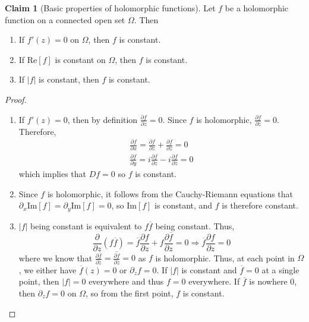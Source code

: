\documentclass[aps,pra,showpacs,notitlepage,onecolumn,superscriptaddress,nofootinbib]{revtex4-1}
\theoremstyle{definition}
\newtheorem{claim}{Claim}[section]
\begin{document}
\begin{claim}[Basic properties of holomorphic functions]
  Let $f$ be a holomorphic function on a connected open set $\Omega$. Then
  \begin{enumerate}
  \item If $f'(z) = 0$ on $\Omega$, then $f$ is constant.
  \item If $\text{Re}[f]$ is constant on $\Omega$, then $f$ is constant.
    \item If $|f|$ is constant, then $f$ is constant.
    \end{enumerate}
\end{claim}
\begin{proof}
  \begin{enumerate}
  \item If $f'(z) = 0$, then by definition $\frac{\partial f}{\partial z} = 0$. Since $f$ is holomorphic, $\frac{\partial f}{\partial \overline{z}} = 0$. Therefore,
    \begin{align}
      \frac{\partial f}{\partial x} = \frac{\partial f}{\partial z} + \frac{\partial f}{\partial \overline{z}} = 0
      \\  \frac{\partial f}{\partial y} = i\frac{\partial f}{\partial z} - i \frac{\partial f}{\partial \overline{z}} = 0
    \end{align}
    which implies that $Df = 0$ so $f$ is constant.
  \item Since $f$ is holomorphic, it follows from the Cauchy-Riemann equations that $\partial_x \text{Im}[f] = \partial_y \text{Im}[f] = 0$, so $\text{Im}[f]$ is constant, and $f$ is therefore constant.
  \item $|f|$ being constant is equivalent to $f \overline{f}$ being constant. Thus,
    \begin{equation}
      \frac{\partial}{\partial z} (f \overline{f}) = \overline{f} \frac{\partial f}{\partial z} + f \frac{\partial \overline{f}}{\partial z} = 0 \Longrightarrow \overline{f} \frac{\partial f}{\partial z} = 0
    \end{equation}
    where we know that $\frac{\partial \overline{f}}{\partial z} = \overline{\frac{\partial f}{\partial \overline{z}}} = 0$ as $f$ is holomorphic. Thus, at each point in $\Omega$, we either have $\overline{f}(z) = 0$ or
    $\partial_z f = 0$. If $|f|$ is constant and $\overline{f} = 0$ at a single point, then $|f| = 0$ everywhere and thus $f = 0$ everywhere. If $\overline{f}$ is nowhere $0$, then $\partial_z f = 0$ on $\Omega$, so from the first
    point, $f$ is constant.
    \end{enumerate}
\end{proof}
\end{document}
